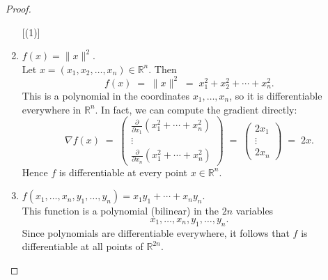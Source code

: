 \documentclass[11pt]{article}
\begin{document}
\begin{exercise}{3}
    \begin{proof}
        \begin{enumerate} [(1)]
            \item $f(x) = \|x\|^2$. \\

            Let $x = (x_1,x_2,\ldots,x_n)\in\mathbb{R}^n$.  Then
\[
  f(x) \;=\; \|x\|^2 \;=\; x_1^2 + x_2^2 + \cdots + x_n^2.
\]
This is a polynomial in the coordinates $x_1,\ldots,x_n$, so it is differentiable everywhere in $\mathbb{R}^n$.  In fact, we can compute the gradient directly:
\[
  \nabla f(x)
  \;=\;
  \begin{pmatrix}
    \frac{\partial}{\partial x_1} (x_1^2 + \cdots + x_n^2)\\[6pt]
    \vdots\\[6pt]
    \frac{\partial}{\partial x_n} (x_1^2 + \cdots + x_n^2)
  \end{pmatrix}
  \;=\;
  \begin{pmatrix}
    2x_1\\[6pt]
    \vdots\\[6pt]
    2x_n
  \end{pmatrix}
  \;=\;
  2x.
\]
Hence $f$ is differentiable at every point $x \in \mathbb{R}^n$.
    \item $f(x_1,\ldots,x_n,y_1,\ldots,y_n) = x_1y_1 + \cdots + x_ny_n$. \\

        This function is a polynomial (bilinear) in the $2n$ variables 
\[
  x_1,\ldots,x_n,y_1,\ldots,y_n.
\]
Since polynomials are differentiable everywhere, it follows that $f$ is differentiable at all points of $\mathbb{R}^{2n}$.
        \end{enumerate}
    \end{proof}
\end{exercise}
\end{document}
